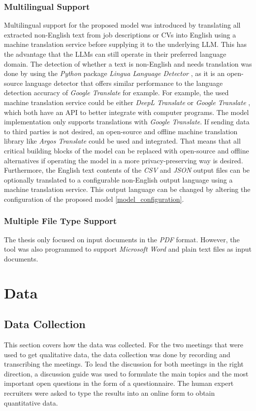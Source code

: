 \documentclass[draft,final]{thesisclass} %
\begin{document}
\subsection{Multilingual Support}
Multilingual support for the proposed model was introduced by translating all extracted non-English text from job descriptions or \acs{CV}s into English using a machine translation service before supplying it to the underlying \gls{LLM}.
This has the advantage that the \gls{LLM}s can still operate in their preferred language domain.
The detection of whether a text is non-English and needs translation was done by using the \textit{Python} package \textit{Lingua Language Detector} \parencite{lingua_language_detector}, as it is an open-source language detector that offers similar performance to the language detection accuracy of \textit{Google Translate} for example.
For example, the used machine translation service could be either \textit{DeepL Translate} \parencite{deepl_translate} or \textit{Google Translate} \parencite{google_translate}, which both have an API to better integrate with computer programs.
The model implementation only supports translations with \textit{Google Translate}.
If sending data to third parties is not desired, an open-source and offline machine translation library like \textit{Argos Translate} \parencite{argos_translate} could be used and integrated.
That means that all critical building blocks of the model can be replaced with open-source and offline alternatives if operating the model in a more privacy-preserving way is desired.
Furthermore, the English text contents of the \textit{CSV} and \textit{JSON} output files can be optionally translated to a configurable non-English output language using a machine translation service.
This output language can be changed by altering the configuration of the proposed model \ref{model_configuration}.

\subsection{Multiple File Type Support}
The thesis only focused on input documents in the \textit{PDF} format.
However, the tool was also programmed to support \textit{Microsoft Word} and plain text files as input documents.

\chapter{Data} \label{data}

\section{Data Collection}
This section covers how the data was collected.
For the two meetings that were used to get qualitative data, the data collection was done by recording and transcribing the meetings.
To lead the discussion for both meetings in the right direction, a discussion guide was used to formulate the main topics and the most important open questions in the form of a questionnaire.
The human expert recruiters were asked to type the results into an online form to obtain quantitative data.
\end{document}
